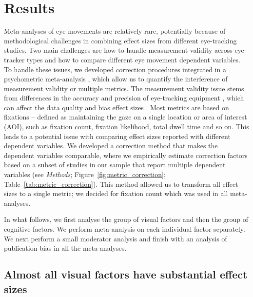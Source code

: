 
\section{Results}

Meta-analyses of eye movements are relatively rare, potentially because of methodological challenges in combining effect sizes from different eye-tracking studies. Two main challenges are how to handle measurement validity across eye-tracker types and how to compare different eye movement dependent variables. To handle these issues, we developed correction procedures integrated in a psychometric meta-analysis \citep{hunter2004a}, which allow us to quantify the interference of measurement validity or multiple metrics. The measurement validity issue stems from differences in the accuracy and precision of eye-tracking equipment \citep{holmqvist2015a}, which can affect the data quality and bias effect sizes \citep{orquin2016a}.  Most metrics are based on fixations -- defined as maintaining the gaze on a single location or area of interest (AOI), such as fixation count, fixation likelihood, total dwell time and so on. This leads to a potential issue with comparing effect sizes reported with different dependent variables. We developed a correction method that makes the dependent variables comparable, where we empirically estimate correction factors based on a subset of studies in our sample that report multiple dependent variables (see \textit{Methods}; Figure~\ref{fig:metric_correction}; Table~\ref{tab:metric_correction}). This method allowed us to transform all effect sizes to a single metric; we decided for fixation count which was used in all meta-analyses. 

In what follows, we first analyse the group of visual factors and then the group of cognitive factors. We perform meta-analysis on each individual factor  separately. We next perform a small moderator analysis and finish with an analysis of publication bias in all the meta-analyses.  


\subsection{Almost all visual factors have substantial effect sizes}

